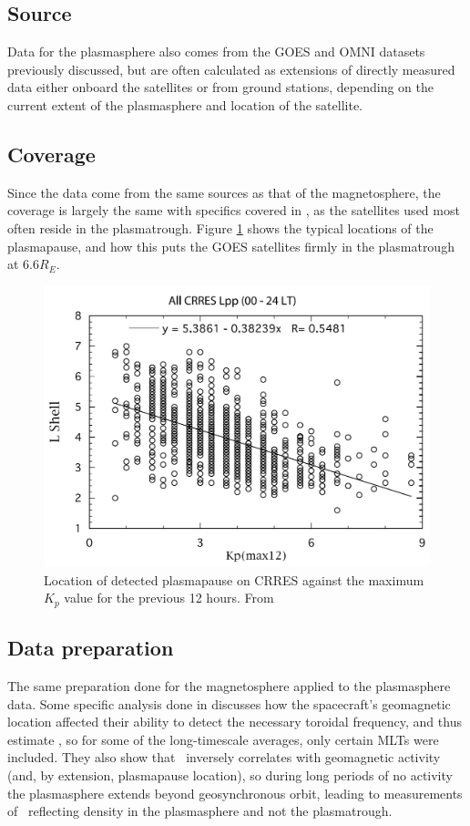 \subsection{Source}
Data for the plasmasphere also comes from the GOES and OMNI datasets previously discussed, but are often calculated as extensions of directly measured data either onboard the satellites or from ground stations, depending on the current extent of the plasmasphere and location of the satellite.

\subsection{Coverage}
Since the data come from the same sources as that of the magnetosphere, the coverage is largely the same with specifics covered in \cite{Takahashi2010SolarCycleVariation}, as the satellites used most often reside in the plasmatrough. Figure \ref{fig:PlasmatroughLocation} shows the typical locations of the plasmapause, and how this puts the GOES satellites firmly in the plasmatrough at 6.6$R_E$.

\begin{figure}[htp!]
	\centering
	\includegraphics[width=0.8\linewidth]{Figures/LShellPlasmapuse.png}
	\caption{Location of detected plasmapause on CRRES against the maximum $K_p$ value for the previous 12 hours. From \citep{Moldwin2002ModelPlasmapause}}
	\label{fig:PlasmatroughLocation}
\end{figure}



\subsection{Data preparation}
The same preparation done for the magnetosphere applied to the plasmasphere data.  Some specific analysis done in \cite{Takahashi2010SolarCycleVariation} discusses how the spacecraft's geomagnetic location affected their ability to detect the necessary toroidal frequency, and thus estimate \req, so for some of the long-timescale averages, only certain MLTs were included. They also show that \req\ inversely correlates with geomagnetic activity (and, by extension, plasmapause location), so during long periods of no activity the plasmasphere extends beyond geosynchronous orbit, leading to measurements of \req\ reflecting density in the plasmasphere and not the plasmatrough. 


